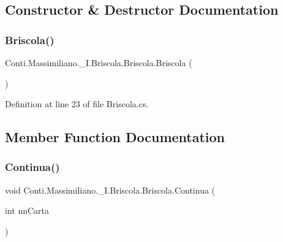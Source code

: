 \subsection{Constructor \& Destructor Documentation}
\hypertarget{class_conti_1_1_massimiliano_1_1__5_i_1_1_briscola_1_1_briscola_af7ad37cd4d1d05da2444120b8476c6c8}{}\label{class_conti_1_1_massimiliano_1_1__5_i_1_1_briscola_1_1_briscola_af7ad37cd4d1d05da2444120b8476c6c8} 
\subsubsection{\texorpdfstring{Briscola()}{Briscola()}}
{\footnotesize\ttfamily Conti.\+Massimiliano.\+\_\+I.\+Briscola.\+Briscola.\+Briscola (\begin{DoxyParamCaption}{ }\end{DoxyParamCaption})}



Definition at line 23 of file Briscola.\+cs.



\subsection{Member Function Documentation}
\hypertarget{class_conti_1_1_massimiliano_1_1__5_i_1_1_briscola_1_1_briscola_a55f3c866353cab10aa111fc41355c530}{}\label{class_conti_1_1_massimiliano_1_1__5_i_1_1_briscola_1_1_briscola_a55f3c866353cab10aa111fc41355c530} 
\subsubsection{\texorpdfstring{Continua()}{Continua()}}
{\footnotesize\ttfamily void Conti.\+Massimiliano.\+\_\+I.\+Briscola.\+Briscola.\+Continua (\begin{DoxyParamCaption}\item[{int}]{nn\+Carta }\end{DoxyParamCaption})}



